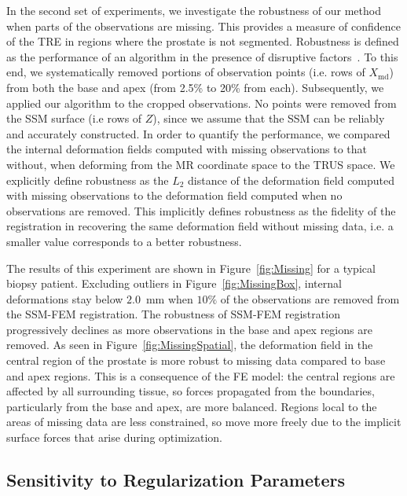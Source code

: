 \documentclass[journal]{IEEEtran}
\begin{document}
In the second set of experiments, we investigate the robustness of our method when parts of the observations are missing. This provides a measure of confidence of the TRE in regions where the prostate is not segmented. Robustness is defined as the performance of an algorithm in the presence of disruptive factors~\cite{Jannin02a}. To this end, we systematically removed portions of observation points (i.e. rows of $X_\mathrm{md}$) from both the base and apex (from 2.5\% to 20\% from each). Subsequently, we applied our algorithm to the cropped observations. No points were removed from the SSM surface (i.e rows of $Z$), since we assume that the SSM can be reliably and accurately constructed. In order to quantify the performance, we compared the internal deformation fields computed with missing observations to that without, when deforming from the MR coordinate space to the TRUS space. We explicitly define robustness as the $L_2$ distance of the deformation field computed with missing observations to the deformation field computed when no observations are removed. This implicitly defines robustness as the fidelity of the registration in recovering the same deformation field without missing data, i.e. a smaller value corresponds to a better robustness.

The results of this experiment are shown in Figure~\ref{fig:Missing} for a typical biopsy patient. Excluding outliers in Figure~\ref{fig:MissingBox}, internal deformations stay below $2.0$~mm when $10\%$ of the observations are removed from the SSM-FEM registration. The robustness of SSM-FEM registration progressively declines as more observations in the base and apex regions are removed. As seen in Figure~\ref{fig:MissingSpatial}, the deformation field in the central region of the prostate is more robust to missing data compared to base and apex regions. This is a consequence of the FE model: the central regions are affected by all surrounding tissue, so forces propagated from the boundaries, particularly from the base and apex, are more balanced.  Regions local to the areas of missing data are less constrained, so move more freely due to the implicit surface forces that arise during optimization.

\subsection{Sensitivity to Regularization Parameters}\label{sec:exp3}
\end{document}
